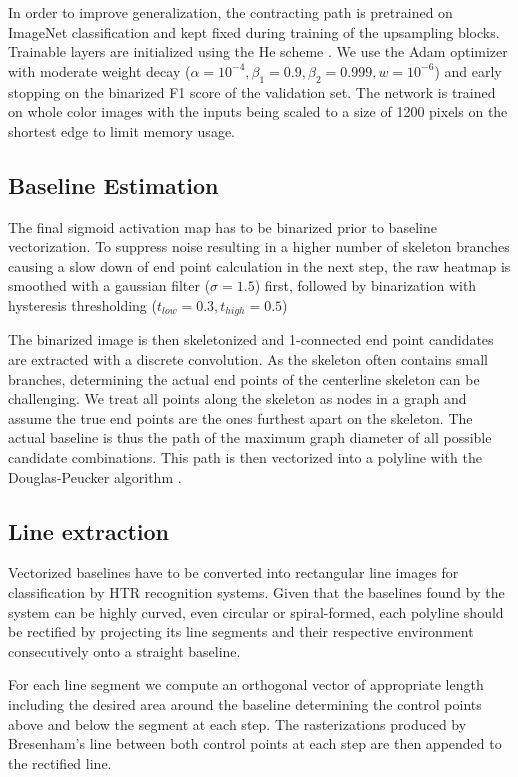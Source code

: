 In order to improve generalization, the contracting path is pretrained on
ImageNet classification and kept fixed during training of the upsampling
blocks. Trainable layers are initialized using the He scheme
\cite{he2015delving}. We use the Adam optimizer with moderate weight decay
($\alpha = 10^{-4}, \beta_1 = 0.9, \beta_2 = 0.999, w = 10^{-6}$) and early
stopping on the binarized F1 score of the validation set.  The network is
trained on whole color images with the inputs being scaled to a size of 1200
pixels on the shortest edge to limit memory usage.


\subsection{Baseline Estimation}

The final sigmoid activation map has to be binarized prior to baseline
vectorization. To suppress noise resulting in a higher number of skeleton
branches causing a slow down of end point calculation in the next step, the raw
heatmap is smoothed with a gaussian filter ($\sigma = 1.5$) first, followed by
binarization with hysteresis thresholding ($t_{low} = 0.3, t_{high} = 0.5$)

The binarized image is then skeletonized \cite{lee1994building} and 1-connected
end point candidates are extracted with a discrete convolution. As the skeleton
often contains small branches, determining the actual end points of the
centerline skeleton can be challenging. We treat all points along the skeleton
as nodes in a graph and assume the true end points are the ones furthest apart
on the skeleton. The actual baseline is thus the path of the maximum graph
diameter of all possible candidate combinations. This path is then vectorized
into a polyline with the Douglas-Peucker algorithm
\cite{douglas1973algorithms}.

\subsection{Line extraction}

Vectorized baselines have to be converted into rectangular line images for
classification by HTR recognition systems. Given that the baselines found by
the system can be highly curved, even circular or spiral-formed, each polyline
should be rectified by projecting its line segments and their respective
environment consecutively onto a straight baseline.

For each line segment we compute an orthogonal vector of appropriate length
including the desired area around the baseline determining the control points
above and below the segment at each step. The rasterizations produced by
Bresenham's line between both control points at each step are then appended to
the rectified line.

